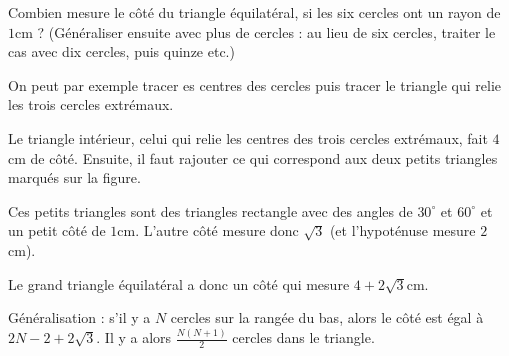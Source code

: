 
\begin{exo}
Combien mesure le côté du triangle équilatéral, si les six cercles ont un rayon de $1$cm ?
(Généraliser ensuite avec plus de cercles : au lieu de six cercles, traiter le cas avec dix cercles, puis quinze etc.)
\begin{center}
\end{center}
\begin{hint}
On peut par exemple tracer es centres des cercles puis tracer le triangle qui relie les trois cercles extrémaux.
\end{hint}
\begin{sol}
\begin{center}
\end{center}
Le triangle \og intérieur\fg, celui qui relie les centres des trois cercles extrémaux, fait $4$cm de côté.
Ensuite, il faut rajouter ce qui correspond aux deux petits triangles marqués sur la figure. 

Ces petits triangles sont des triangles rectangle avec des angles de $30^\circ$ et $60^\circ$ et un petit côté de $1$cm.
L'autre côté mesure donc $\sqrt 3$ (et l'hypoténuse mesure $2$cm).

Le grand triangle équilatéral a donc un côté qui mesure $4+2\sqrt 3$cm.

Généralisation : s'il y a $N$ cercles sur la rangée du bas, alors le côté est égal à $2N-2+2\sqrt 3$.
Il y a alors $\frac{N(N+1)}{2}$ cercles dans le triangle.
\end{sol}
\end{exo}






